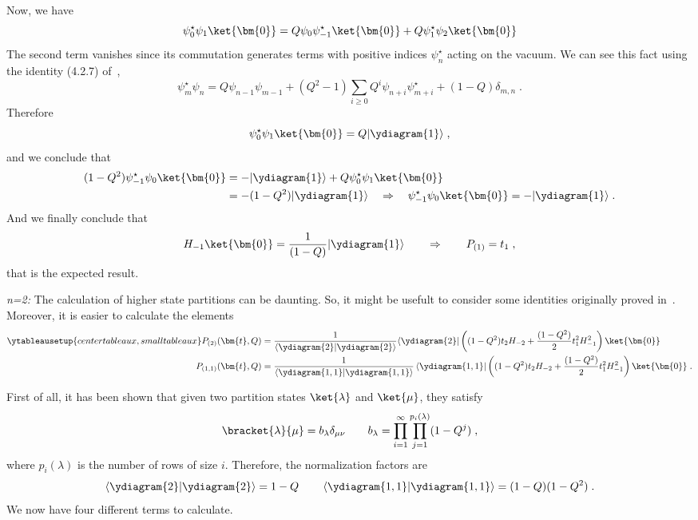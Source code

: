 Now, we have 
\begin{equation}
  \psi_0^\star \psi_1 \ket{\bm{0}} = Q \psi_0 \psi_{-1}^\star \ket{\bm{0}} +
  Q \psi^\star_1 \psi_2 \ket{\bm{0}}
\end{equation}
The second term vanishes since its commutation generates terms with
positive indices \(\psi_n^\star\) acting on the vacuum. We can see
this fact using the identity (4.2.7) of~\cite{Wheeler:2010vmq},
\begin{equation}
  \psi_m^\star \psi_n = Q \psi_{n-1} \psi_{m-1} + (Q^2 - 1)
  \sum_{i\geq 0} Q^i \psi_{n+i} \psi_{m+i}^\star + (1-Q)\delta_{m,n}\;
  .
\end{equation}
Therefore
\begin{equation}
  \psi_0^\star \psi_1 \ket{\bm{0}} = Q |\ydiagram{1}\rangle\; , 
\end{equation}
and we conclude that
\begin{equation}
  \begin{split}
    (1 - Q^2)\psi_{-1}^\star\psi_{0}\ket{\bm{0}} & = -
    |\ydiagram{1}\rangle + Q \psi_0^\star \psi_1 \ket{\bm{0}} \\ & = -
    (1-Q^2) |\ydiagram{1}\rangle\quad \Rightarrow \quad
    \psi_{-1}^\star\psi_{0}\ket{\bm{0}} = - |\ydiagram{1}\rangle\; .
  \end{split}
\end{equation}
And we finally conclude that 
\begin{equation}
H_{-1} \ket{\bm{0}} = \frac{1}{(1- Q)}|\ydiagram{1}\rangle \qquad
\Rightarrow \qquad P_{(1)} = t_1\;,
\end{equation}
that is the expected result. 

\emph{n=2:} The calculation of higher state partitions can be
daunting. So, it might be usefult to consider some identities
originally proved in~\cite{Foda:2008hn}. Moreover, it is easier
to calculate the elements
\begin{align}
  \ytableausetup{centertableaux, smalltableaux} 
  P_{(2)}(\bm{t}, Q) & = \frac{1}{\langle \ydiagram{2}  | \ydiagram{2} \rangle} \langle \ydiagram{2}|
  \left((1 - Q^2) t_2 H_{-2} + \frac{(1-Q^2)}{2} t_1^2 H_{-1}^2\right) \ket{\bm{0}} \\
  P_{(1,1)}(\bm{t}, Q) & = \frac{1}{\left\langle \ydiagram{1,1}  | \ydiagram{1,1} \right\rangle}
  \left\langle \ydiagram{1,1}\right|
  \left((1 - Q^2) t_2 H_{-2} + \frac{(1-Q^2)}{2} t_1^2 H_{-1}^2\right) \ket{\bm{0}} \; .
\end{align}

First of all, it has been shown that given two partition states \(\ket{\lambda}\) and \(\ket{\mu}\),
they satisfy
\begin{equation}
  \bracket{\lambda}{\mu} = b_{\lambda} \delta_{\mu\nu}\qquad
  b_\lambda = \prod_{i=1}^\infty \prod_{j=1}^{p_i(\lambda)} (1 - Q^j)\; ,
\end{equation}
where \(p_i(\lambda)\) is the number of rows of size \(i\). Therefore, the normalization factors
are
\begin{equation}
  \langle \ydiagram{2}  | \ydiagram{2} \rangle = 1 - Q\qquad
    \left\langle \ydiagram{1,1}  | \ydiagram{1,1} \right\rangle= (1 - Q)(1- Q^2)\; .
\end{equation}
We now have four different terms to calculate.


